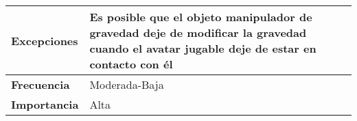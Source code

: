 \begin{longtable}{lll}
\textbf{Excepciones}                             & \multicolumn{2}{l}{Es posible que el objeto manipulador de gravedad deje de modificar la gravedad cuando el avatar jugable deje de estar en contacto con él} \\ \hline
\textbf{Frecuencia}                              & \multicolumn{2}{l}{Moderada-Baja}                                                                                                                            \\ \hline
\textbf{Importancia}                             & \multicolumn{2}{l}{Alta}                                                                                                                                     \\ \hline
\end{longtable}

